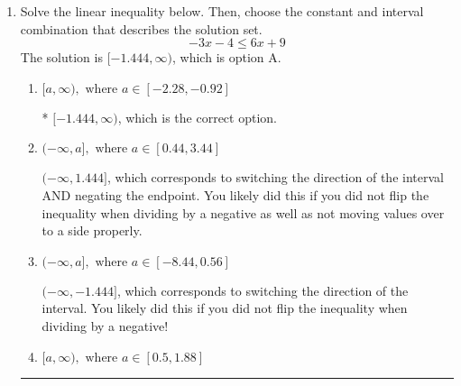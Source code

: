 \documentclass{extbook}[14pt]
\newcommand{\litem}[1]{\item #1

\rule{\textwidth}{0.4pt}}
\begin{document}
\begin{enumerate}
{\begin{enumerate}[label=\Alph*.]
$(-\infty, 2.50] \cup (13.50, \infty)$, which corresponds to displaying the and-inequality as an or-inequality.
\item \( [a, b), \text{ where } a \in [1.5, 6.5] \text{ and } b \in [12.5, 14.5] \)

$[2.50, 13.50)$, which is the correct option.
\item \( (-\infty, a) \cup [b, \infty), \text{ where } a \in [-1.5, 4.5] \text{ and } b \in [11.5, 16.5] \)

$(-\infty, 2.50) \cup [13.50, \infty)$, which corresponds to displaying the and-inequality as an or-inequality AND flipping the inequality.
\item \( (a, b], \text{ where } a \in [1.5, 3.5] \text{ and } b \in [9.5, 16.5] \)

$(2.50, 13.50]$, which corresponds to flipping the inequality.
\item \( \text{None of the above.} \)


\end{enumerate}

\textbf{General Comment:} To solve, you will need to break up the compound inequality into two inequalities. Be sure to keep track of the inequality! It may be best to draw a number line and graph your solution.
}
\litem{
Solve the linear inequality below. Then, choose the constant and interval combination that describes the solution set.
\[ -3x -4 \leq 6x + 9 \]
The solution is \( [-1.444, \infty) \), which is option A.\begin{enumerate}[label=\Alph*.]
\item \( [a, \infty), \text{ where } a \in [-2.28, -0.92] \)

* $[-1.444, \infty)$, which is the correct option.
\item \( (-\infty, a], \text{ where } a \in [0.44, 3.44] \)

 $(-\infty, 1.444]$, which corresponds to switching the direction of the interval AND negating the endpoint. You likely did this if you did not flip the inequality when dividing by a negative as well as not moving values over to a side properly.
\item \( (-\infty, a], \text{ where } a \in [-8.44, 0.56] \)

 $(-\infty, -1.444]$, which corresponds to switching the direction of the interval. You likely did this if you did not flip the inequality when dividing by a negative!
\item \( [a, \infty), \text{ where } a \in [0.5, 1.88] \)


\end{enumerate}}
\end{enumerate}
\end{document}
